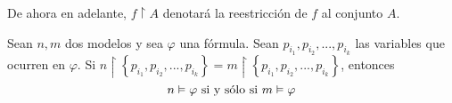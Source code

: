 \documentclass[12pt]{report}
\theoremstyle{largebreak}
\begin{document}
    \newcommand{\rest}{\ensuremath{\upharpoonright}}

    \begin{obs}
        De ahora en adelante, $f\rest A$ denotará la reestricción de $f$ al conjunto $A$.
    \end{obs}

    \begin{lema}
        Sean $n,m$ dos modelos y sea $\varphi$ una fórmula. Sean $p_{ i_1},p_{ i_2},...,p_{ i_k}$ las variables que ocurren en $\varphi$. Si $n\rest\left\{p_{ i_1},p_{ i_2},...,p_{ i_k}\right\}=m\rest\left\{p_{ i_1},p_{ i_2},...,p_{ i_k}\right\}$, entonces
        \begin{equation*}
            n\vDash \varphi\textup{ si y sólo si } m\vDash\varphi
        \end{equation*}
    \end{lema}
\end{document}
